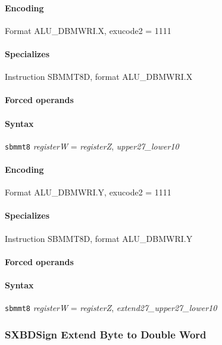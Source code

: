 {\paragraph{Encoding} Format \textsf{ALU\_DBMWRI.X, exucode2 = 1111}\\



\paragraph{Specializes} Instruction SBMMT8D, format ALU\_DBMWRI.X

\paragraph{Forced operands} 

\paragraph{Syntax} \texttt{sbmmt8} \emph{registerW} = \emph{registerZ}, \emph{upper27\_lower10}

\paragraph{Encoding} Format \textsf{ALU\_DBMWRI.Y, exucode2 = 1111}\\



\paragraph{Specializes} Instruction SBMMT8D, format ALU\_DBMWRI.Y

\paragraph{Forced operands} 

\paragraph{Syntax} \texttt{sbmmt8} \emph{registerW} = \emph{registerZ}, \emph{extend27\_upper27\_lower10}
\newpage
\subsubsection[{\small SXBD: Sign Extend Byte to Double Word}]{SXBD\hfill Sign Extend Byte to Double Word}
\label{instr:SXBD}

}
